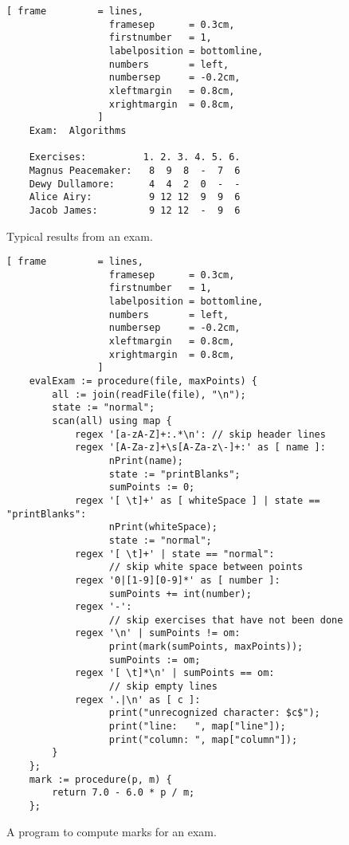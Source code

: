 \begin{figure}[!ht]
\centering
\begin{Verbatim}[ frame         = lines, 
                  framesep      = 0.3cm, 
                  firstnumber   = 1,
                  labelposition = bottomline,
                  numbers       = left,
                  numbersep     = -0.2cm,
                  xleftmargin   = 0.8cm,
                  xrightmargin  = 0.8cm,
                ]
    Exam:  Algorithms
    
    Exercises:          1. 2. 3. 4. 5. 6.
    Magnus Peacemaker:   8  9  8  -  7  6
    Dewy Dullamore:      4  4  2  0  -  -
    Alice Airy:          9 12 12  9  9  6
    Jacob James:         9 12 12  -  9  6
\end{Verbatim}
\vspace*{-0.3cm}
\caption{Typical results from an exam.}
\label{fig:result.txt}
\end{figure}


\begin{figure}[!ht]
\centering
\begin{Verbatim}[ frame         = lines, 
                  framesep      = 0.3cm, 
                  firstnumber   = 1,
                  labelposition = bottomline,
                  numbers       = left,
                  numbersep     = -0.2cm,
                  xleftmargin   = 0.8cm,
                  xrightmargin  = 0.8cm,
                ]
    evalExam := procedure(file, maxPoints) {
        all := join(readFile(file), "\n");
        state := "normal";
        scan(all) using map {
            regex '[a-zA-Z]+:.*\n': // skip header lines
            regex '[A-Za-z]+\s[A-Za-z\-]+:' as [ name ]:
                  nPrint(name);
                  state := "printBlanks";
                  sumPoints := 0;
            regex '[ \t]+' as [ whiteSpace ] | state == "printBlanks":
                  nPrint(whiteSpace);  
                  state := "normal";
            regex '[ \t]+' | state == "normal": 
                  // skip white space between points
            regex '0|[1-9][0-9]*' as [ number ]:
                  sumPoints += int(number);
            regex '-': 
                  // skip exercises that have not been done  
            regex '\n' | sumPoints != om:
                  print(mark(sumPoints, maxPoints));
                  sumPoints := om;
            regex '[ \t]*\n' | sumPoints == om:
                  // skip empty lines
            regex '.|\n' as [ c ]:
                  print("unrecognized character: $c$");
                  print("line:   ", map["line"]);
                  print("column: ", map["column"]);
        }
    };
    mark := procedure(p, m) {
        return 7.0 - 6.0 * p / m;
    };    
\end{Verbatim}
\vspace*{-0.3cm}
\caption{A program to compute marks for an exam.}
\label{fig:exam.stlx}
\end{figure}

